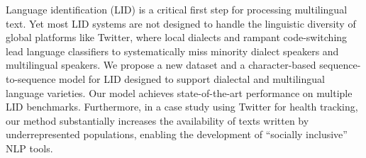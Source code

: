 Language identification (LID) is a critical first step for processing multilingual text.  Yet most LID systems are not designed to handle the linguistic diversity of global platforms like Twitter, where local dialects and rampant code-switching lead language classifiers to systematically miss minority dialect speakers and multilingual speakers.  We propose a new dataset and a character-based sequence-to-sequence model for LID designed to support dialectal and multilingual language varieties. Our model achieves state-of-the-art performance on multiple LID benchmarks.  Furthermore, in a case study using Twitter for health tracking,  our method substantially increases the availability of texts written by underrepresented populations, enabling the development of ``socially inclusive'' NLP tools.
